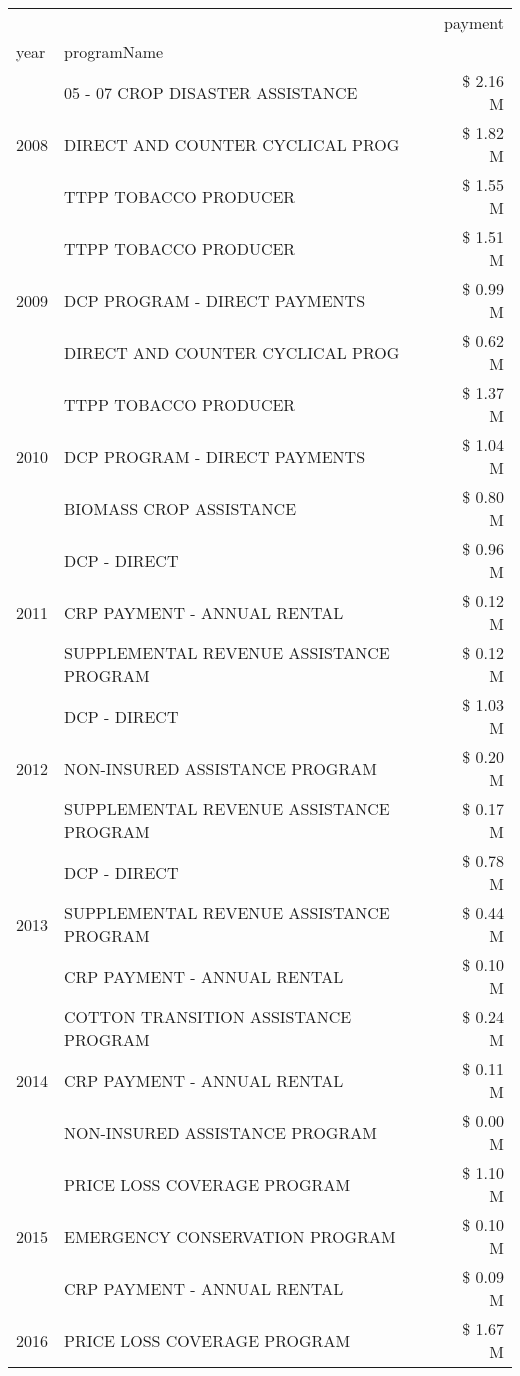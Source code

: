 \begin{tabular}{llr}
\toprule
 &  & payment \\
year & programName &  \\
\midrule
\multirow[t]{3}{*}{2008} & 05 - 07 CROP DISASTER ASSISTANCE & \$ 2.16 M \\
 & DIRECT AND COUNTER CYCLICAL PROG & \$ 1.82 M \\
 & TTPP TOBACCO PRODUCER & \$ 1.55 M \\
\cline{1-3}
\multirow[t]{3}{*}{2009} & TTPP TOBACCO PRODUCER & \$ 1.51 M \\
 & DCP PROGRAM - DIRECT PAYMENTS & \$ 0.99 M \\
 & DIRECT AND COUNTER CYCLICAL PROG & \$ 0.62 M \\
\cline{1-3}
\multirow[t]{3}{*}{2010} & TTPP TOBACCO PRODUCER & \$ 1.37 M \\
 & DCP PROGRAM - DIRECT PAYMENTS & \$ 1.04 M \\
 & BIOMASS CROP ASSISTANCE & \$ 0.80 M \\
\cline{1-3}
\multirow[t]{3}{*}{2011} & DCP - DIRECT & \$ 0.96 M \\
 & CRP PAYMENT - ANNUAL RENTAL & \$ 0.12 M \\
 & SUPPLEMENTAL REVENUE ASSISTANCE PROGRAM & \$ 0.12 M \\
\cline{1-3}
\multirow[t]{3}{*}{2012} & DCP - DIRECT & \$ 1.03 M \\
 & NON-INSURED ASSISTANCE PROGRAM & \$ 0.20 M \\
 & SUPPLEMENTAL REVENUE ASSISTANCE PROGRAM & \$ 0.17 M \\
\cline{1-3}
\multirow[t]{3}{*}{2013} & DCP - DIRECT & \$ 0.78 M \\
 & SUPPLEMENTAL REVENUE ASSISTANCE PROGRAM & \$ 0.44 M \\
 & CRP PAYMENT - ANNUAL RENTAL & \$ 0.10 M \\
\cline{1-3}
\multirow[t]{3}{*}{2014} & COTTON TRANSITION ASSISTANCE PROGRAM & \$ 0.24 M \\
 & CRP PAYMENT - ANNUAL RENTAL & \$ 0.11 M \\
 & NON-INSURED ASSISTANCE PROGRAM & \$ 0.00 M \\
\cline{1-3}
\multirow[t]{3}{*}{2015} & PRICE LOSS COVERAGE PROGRAM & \$ 1.10 M \\
 & EMERGENCY CONSERVATION PROGRAM & \$ 0.10 M \\
 & CRP PAYMENT - ANNUAL RENTAL & \$ 0.09 M \\
\cline{1-3}
\multirow[t]{3}{*}{2016} & PRICE LOSS COVERAGE PROGRAM & \$ 1.67 M \\

\end{tabular}
